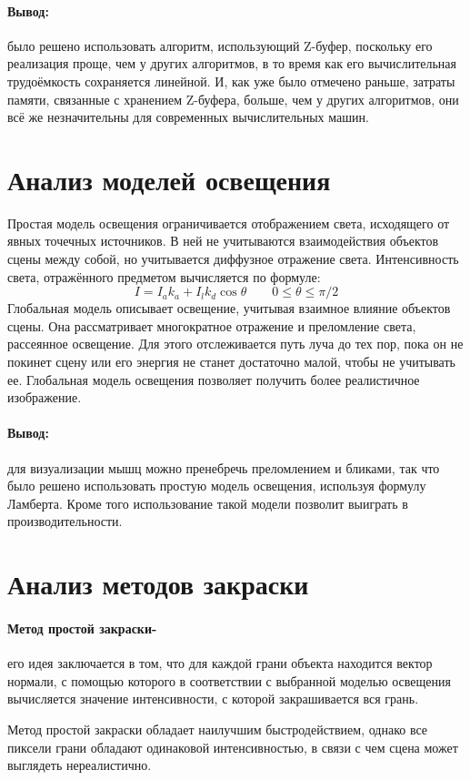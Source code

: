 \paragraph{Вывод:} было решено использовать алгоритм, использующий Z-буфер, поскольку его реализация проще, чем у других алгоритмов, в то время как его вычислительная трудоёмкость сохраняется линейной. И, как уже было отмечено раньше, затраты памяти, связанные с хранением Z-буфера, больше, чем у других алгоритмов, они всё же незначительны для современных вычислительных машин.


\section{Анализ моделей освещения}
\label{sec:light}
Простая модель освещения ограничивается отображением света, исходящего от явных точечных источников. В ней не учитываются взаимодействия объектов сцены между собой, но учитывается диффузное отражение света. Интенсивность света, отражённого предметом вычисляется по формуле:
\begin{equation}\label{lambert}
I = I_{a}k_{a} + I_{l}k_{d}\cos \theta \qquad 0\leq\theta\leq\pi/2
\end{equation}
Глобальная модель описывает освещение, учитывая взаимное влияние объектов сцены. Она рассматривает многократное отражение и преломление света, рассеянное освещение. Для этого отслеживается путь луча до тех пор, пока он не покинет сцену или его энергия не станет достаточно малой, чтобы не учитывать ее. Глобальная модель освещения позволяет получить более реалистичное изображение.
\paragraph{Вывод:} для визуализации мышц можно пренебречь преломлением и бликами, так что было решено использовать простую модель освещения, используя формулу Ламберта. Кроме того использование такой модели позволит выиграть в производительности.

\section{Анализ методов закраски}
\label{sec:color}
\paragraph{Метод простой закраски-} его идея заключается в том, что для каждой грани объекта находится вектор нормали, с помощью которого в соответствии с выбранной моделью освещения вычисляется значение интенсивности, с которой закрашивается вся грань.
\par Метод простой закраски обладает наилучшим быстродействием, однако все пиксели грани обладают одинаковой интенсивностью, в связи с чем сцена может выглядеть нереалистично.

